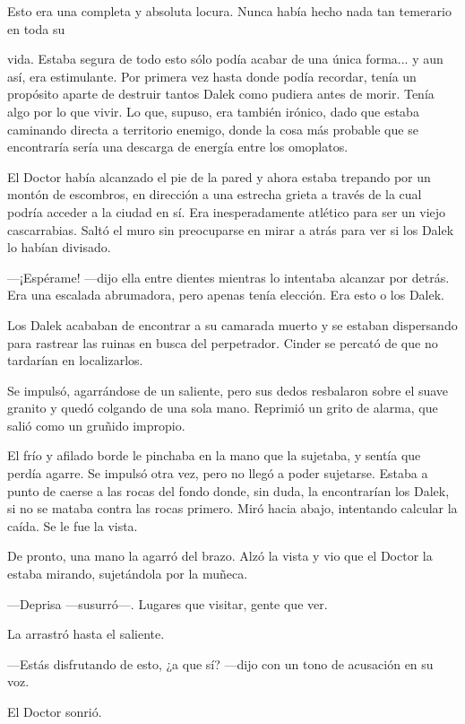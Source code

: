 Esto era una completa y absoluta locura. Nunca había hecho nada tan temerario en toda su 

vida. Estaba segura de todo esto sólo podía acabar de una única forma... y aun así, era estimulante. Por primera vez hasta donde podía recordar, tenía un propósito aparte de destruir tantos Dalek como pudiera antes de morir. Tenía algo por lo que vivir. Lo que, supuso, era también irónico, dado que estaba caminando directa a territorio enemigo, donde la cosa más probable que se encontraría sería una descarga de energía entre los omoplatos.

El Doctor había alcanzado el pie de la pared y ahora estaba trepando por un montón de escombros, en dirección a una estrecha grieta a través de la cual podría acceder a la ciudad en sí. Era inesperadamente atlético para ser un viejo cascarrabias. Saltó el muro sin preocuparse en mirar a atrás para ver si los Dalek lo habían divisado.



—¡Espérame! —dijo ella entre dientes mientras lo intentaba alcanzar por detrás. Era una escalada abrumadora, pero apenas tenía elección. Era esto o los Dalek.

Los Dalek acababan de encontrar a su camarada muerto y se estaban dispersando para rastrear las ruinas en busca del perpetrador. Cinder se percató de que no tardarían en localizarlos.

Se impulsó, agarrándose de un saliente, pero sus dedos resbalaron sobre el suave granito y quedó colgando de una sola mano. Reprimió un grito de alarma, que salió como un gruñido impropio.

El frío y afilado borde le pinchaba en la mano que la sujetaba, y sentía que perdía agarre. Se impulsó otra vez, pero no llegó a poder sujetarse. Estaba a punto de caerse a las rocas del fondo donde, sin duda, la encontrarían los Dalek, si no se mataba contra las rocas primero. Miró hacia abajo, intentando calcular la caída. Se le fue la vista.

De pronto, una mano la agarró del brazo. Alzó la vista y vio que el Doctor la estaba mirando, sujetándola por la muñeca.



—Deprisa —susurró—. Lugares que visitar, gente que ver.

La arrastró hasta el saliente.

—Estás disfrutando de esto, ¿a que sí? —dijo con un tono de acusación en su voz.

El Doctor sonrió.

